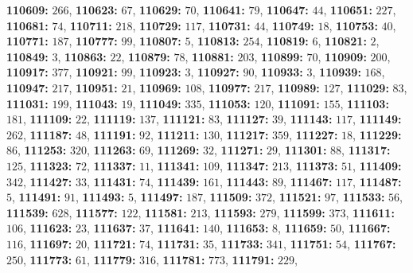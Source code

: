 \textsf{\bfseries 110609:} $266$, \textsf{\bfseries 110623:} $67$, \textsf{\bfseries 110629:} $70$, \textsf{\bfseries 110641:} $79$, \textsf{\bfseries 110647:} $44$, \textsf{\bfseries 110651:} $227$, \textsf{\bfseries 110681:} $74$, \textsf{\bfseries 110711:} $218$, \textsf{\bfseries 110729:} $117$, \textsf{\bfseries 110731:} $44$, \textsf{\bfseries 110749:} $18$, \textsf{\bfseries 110753:} $40$, \textsf{\bfseries 110771:} $187$, \textsf{\bfseries 110777:} $99$, \textsf{\bfseries 110807:} $5$, \textsf{\bfseries 110813:} $254$, \textsf{\bfseries 110819:} $6$, \textsf{\bfseries 110821:} $2$, \textsf{\bfseries 110849:} $3$, \textsf{\bfseries 110863:} $22$, \textsf{\bfseries 110879:} $78$, \textsf{\bfseries 110881:} $203$, \textsf{\bfseries 110899:} $70$, \textsf{\bfseries 110909:} $200$, \textsf{\bfseries 110917:} $377$, \textsf{\bfseries 110921:} $99$, \textsf{\bfseries 110923:} $3$, \textsf{\bfseries 110927:} $90$, \textsf{\bfseries 110933:} $3$, \textsf{\bfseries 110939:} $168$, \textsf{\bfseries 110947:} $217$, \textsf{\bfseries 110951:} $21$, \textsf{\bfseries 110969:} $108$, \textsf{\bfseries 110977:} $217$, \textsf{\bfseries 110989:} $127$, \textsf{\bfseries 111029:} $83$, \textsf{\bfseries 111031:} $199$, \textsf{\bfseries 111043:} $19$, \textsf{\bfseries 111049:} $335$, \textsf{\bfseries 111053:} $120$, \textsf{\bfseries 111091:} $155$, \textsf{\bfseries 111103:} $181$, \textsf{\bfseries 111109:} $22$, \textsf{\bfseries 111119:} $137$, \textsf{\bfseries 111121:} $83$, \textsf{\bfseries 111127:} $39$, \textsf{\bfseries 111143:} $117$, \textsf{\bfseries 111149:} $262$, \textsf{\bfseries 111187:} $48$, \textsf{\bfseries 111191:} $92$, \textsf{\bfseries 111211:} $130$, \textsf{\bfseries 111217:} $359$, \textsf{\bfseries 111227:} $18$, \textsf{\bfseries 111229:} $86$, \textsf{\bfseries 111253:} $320$, \textsf{\bfseries 111263:} $69$, \textsf{\bfseries 111269:} $32$, \textsf{\bfseries 111271:} $29$, \textsf{\bfseries 111301:} $88$, \textsf{\bfseries 111317:} $125$, \textsf{\bfseries 111323:} $72$, \textsf{\bfseries 111337:} $11$, \textsf{\bfseries 111341:} $109$, \textsf{\bfseries 111347:} $213$, \textsf{\bfseries 111373:} $51$, \textsf{\bfseries 111409:} $342$, \textsf{\bfseries 111427:} $33$, \textsf{\bfseries 111431:} $74$, \textsf{\bfseries 111439:} $161$, \textsf{\bfseries 111443:} $89$, \textsf{\bfseries 111467:} $117$, \textsf{\bfseries 111487:} $5$, \textsf{\bfseries 111491:} $91$, \textsf{\bfseries 111493:} $5$, \textsf{\bfseries 111497:} $187$, \textsf{\bfseries 111509:} $372$, \textsf{\bfseries 111521:} $97$, \textsf{\bfseries 111533:} $56$, \textsf{\bfseries 111539:} $628$, \textsf{\bfseries 111577:} $122$, \textsf{\bfseries 111581:} $213$, \textsf{\bfseries 111593:} $279$, \textsf{\bfseries 111599:} $373$, \textsf{\bfseries 111611:} $106$, \textsf{\bfseries 111623:} $23$, \textsf{\bfseries 111637:} $37$, \textsf{\bfseries 111641:} $140$, \textsf{\bfseries 111653:} $8$, \textsf{\bfseries 111659:} $50$, \textsf{\bfseries 111667:} $116$, \textsf{\bfseries 111697:} $20$, \textsf{\bfseries 111721:} $74$, \textsf{\bfseries 111731:} $35$, \textsf{\bfseries 111733:} $341$, \textsf{\bfseries 111751:} $54$, \textsf{\bfseries 111767:} $250$, \textsf{\bfseries 111773:} $61$, \textsf{\bfseries 111779:} $316$, \textsf{\bfseries 111781:} $773$, \textsf{\bfseries 111791:} $229$, 
